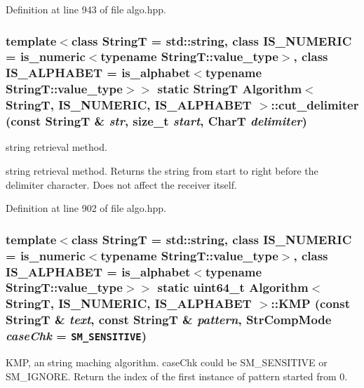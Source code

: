 Definition at line 943 of file algo.hpp.\hypertarget{classAlgorithm_70e04500b28f3c0b0b8cc75532aa4eee}{
\subsubsection[{cut\_\-delimiter}]{\setlength{\rightskip}{0pt plus 5cm}template$<$class StringT  = std::string, class IS\_\-NUMERIC  = is\_\-numeric$<$typename StringT::value\_\-type$>$, class IS\_\-ALPHABET  = is\_\-alphabet$<$typename StringT::value\_\-type$>$$>$ static StringT {\bf Algorithm}$<$ StringT, IS\_\-NUMERIC, IS\_\-ALPHABET $>$::cut\_\-delimiter (const StringT \& {\em str}, \/  size\_\-t {\em start}, \/  CharT {\em delimiter})}}
\label{classAlgorithm_70e04500b28f3c0b0b8cc75532aa4eee}


string retrieval method. 

string retrieval method. Returns the string from start to right before the delimiter character. Does not affect the receiver itself. 

Definition at line 902 of file algo.hpp.\hypertarget{classAlgorithm_9f7fcee0cfbabce55c5a9cabb1868f29}{
\subsubsection[{KMP}]{\setlength{\rightskip}{0pt plus 5cm}template$<$class StringT  = std::string, class IS\_\-NUMERIC  = is\_\-numeric$<$typename StringT::value\_\-type$>$, class IS\_\-ALPHABET  = is\_\-alphabet$<$typename StringT::value\_\-type$>$$>$ static uint64\_\-t {\bf Algorithm}$<$ StringT, IS\_\-NUMERIC, IS\_\-ALPHABET $>$::KMP (const StringT \& {\em text}, \/  const StringT \& {\em pattern}, \/  StrCompMode {\em caseChk} = {\tt SM\_\-SENSITIVE})}}
\label{classAlgorithm_9f7fcee0cfbabce55c5a9cabb1868f29}


KMP, an string maching algorithm. caseChk could be SM\_\-SENSITIVE or SM\_\-IGNORE. Return the index of the first instance of pattern started from 0. 


